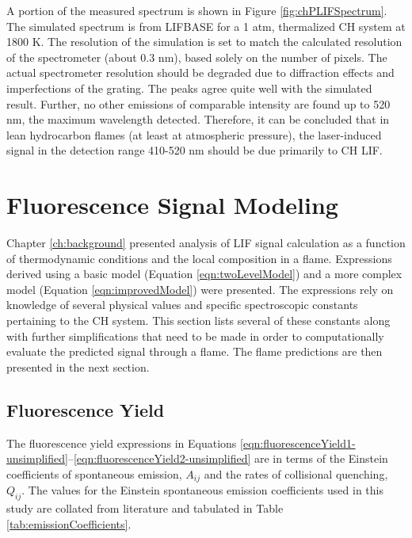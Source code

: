 A portion of the measured spectrum is shown in Figure \ref{fig:chPLIFSpectrum}.
The simulated spectrum is from LIFBASE for a 1 atm, thermalized CH system at 1800 K.
The resolution of the simulation is set to match the calculated resolution of the spectrometer (about 0.3 nm), based solely on the number of pixels.
The actual spectrometer resolution should be degraded due to diffraction effects and imperfections of the grating.
The peaks agree quite well with the simulated result.
Further, no other emissions of comparable intensity are found up to 520 nm, the maximum wavelength detected.
Therefore, it can be concluded that in lean hydrocarbon flames (at least at atmospheric pressure), the laser-induced signal in the detection range 410-520 nm should be due primarily to CH LIF.



\section{Fluorescence Signal Modeling}
\label{sec:chplif-fluorescence-signal-modeling}

Chapter \ref{ch:background} presented analysis of LIF signal calculation as a function of thermodynamic conditions and the local composition in a flame.
Expressions derived using a basic model (Equation \ref{eqn:twoLevelModel}) and a more complex model (Equation \ref{eqn:improvedModel}) were presented.
The expressions rely on knowledge of several physical values and specific spectroscopic constants pertaining to the CH system.
This section lists several of these constants along with further simplifications that need to be made in order to computationally evaluate the predicted signal through a flame. The flame predictions are then presented in the next section.

\subsection{Fluorescence Yield}
\label{subsec:modeling-fluorescence-yield}

The fluorescence yield expressions in Equations \ref{eqn:fluorescenceYield1-unsimplified}--\ref{eqn:fluorescenceYield2-unsimplified} are in terms of the Einstein coefficients of spontaneous emission, \(A_{ij}\) and the rates of collisional quenching, \(Q_{ij}\).
The values for the Einstein spontaneous emission coefficients used in this study are collated from literature\cite{1985-garland-a,1996-luque-b} and tabulated in Table \ref{tab:emissionCoefficients}.

